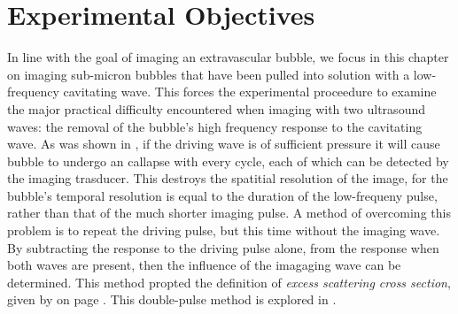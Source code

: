 




\section{Experimental Objectives} \label{sec:WE:objectives}



In line with the goal of imaging an extravascular bubble,
we focus in this chapter on imaging sub-micron bubbles 
that have been pulled into solution with a low-frequency cavitating wave.
This forces the experimental proceedure to 
examine the major practical difficulty encountered when imaging with two ultrasound waves:
the removal of the  bubble's high frequency response to the cavitating wave.
As was shown in ,
if the driving wave is of sufficient pressure 
it will cause bubble to undergo an callapse with every cycle,
each of which  can be detected by the imaging trasducer.
This destroys the spatitial resolution of the image,
for the bubble's temporal resolution is equal to the  duration of the low-frequeny pulse,
rather than that of the much shorter imaging pulse.
A method of overcoming this problem is to repeat the driving pulse,
but this time without the imaging wave.
By subtracting the response to the driving pulse alone,
from the response when both waves are present,
then the influence of the imagaging wave can be determined.
This method propted the definition of {\em excess scattering cross section},
given by  on page \pageref{eqn:excessI}.
This double-pulse method is explored in .




